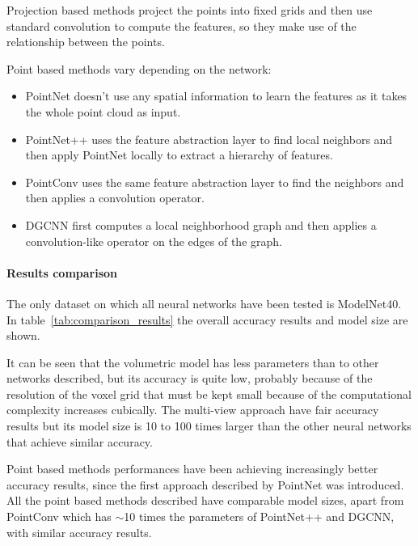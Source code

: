 Projection based methods project the points into fixed grids and then use standard convolution to compute the features, so they make use of the relationship between the points. 

Point based methods vary depending on the network:

\begin{itemize}
    \item PointNet doesn't use any spatial information to learn the features as it takes the whole point cloud as input.
    \item PointNet++ uses the feature abstraction layer to find local neighbors and then apply PointNet locally to extract a hierarchy of features.
    \item PointConv uses the same feature abstraction layer to find the neighbors and then applies a convolution operator.
    \item DGCNN first computes a local neighborhood graph and then applies a convolution-like operator on the edges of the graph.
\end{itemize}

\paragraph{Results comparison}

The only dataset on which all neural networks have been tested is ModelNet40. In table~\ref{tab:comparison_results} the overall accuracy results and model size are shown. 

It can be seen that the volumetric model has less parameters than to other networks described, but its accuracy is quite low, probably because of the resolution of the voxel grid that must be kept small because of the computational complexity increases cubically. The multi-view approach have fair accuracy results but its model size is 10 to 100 times larger than the other neural networks that achieve similar accuracy.

Point based methods performances have been achieving increasingly better accuracy results, since the first approach described by PointNet was introduced. All the point based methods described have comparable model sizes, apart from PointConv which has $\sim$10 times the parameters of PointNet++ and DGCNN, with similar accuracy results.

